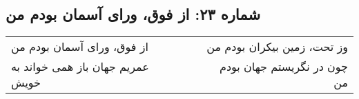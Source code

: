 \begin{center}
\section*{شماره ۲۳: از فوق، ورای آسمان بودم من}
\label{sec:023}
\begin{longtable}{l p{0.5cm} r}
از فوق، ورای آسمان بودم من
&&
وز تحت، زمین بیکران بودم من
\\
عمریم جهان باز همی خواند به خویش
&&
چون در نگریستم جهان بودم من
\\
\end{longtable}
\end{center}
